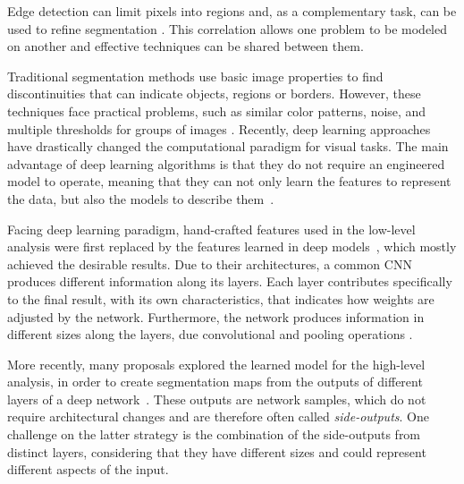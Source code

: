 Edge detection can limit pixels into regions and, as a complementary task, can be used to refine segmentation \cite{MARTIN:1273918}.
This correlation allows one problem to be modeled on another and effective techniques can be shared between them.

Traditional segmentation methods use basic image properties to find discontinuities that can indicate objects, regions or borders.
However, these techniques face practical problems, such as similar color patterns, noise, and multiple thresholds for groups of images \cite{MARTIN:1273918} \cite{Segnet:2017:7803544}.
Recently, deep learning approaches have drastically changed the computational paradigm for visual tasks. The main advantage of deep learning algorithms is that they do not require an engineered model to operate, meaning that they can not only learn the features to represent the data, but also the models to describe them~\cite{Goodfellow:2016}.

Facing deep learning paradigm, hand-crafted features used in the low-level analysis were first replaced by the features learned in deep models~\cite{Farabet:2013, VGGNET:2014, Lee:2015}, which mostly achieved the desirable results.
Due to their architectures, a common CNN produces different information along its layers.
Each layer contributes specifically to the final result, with its own characteristics, that indicates how weights are adjusted by the network.
Furthermore, the network produces information in different sizes along the layers, due convolutional and pooling operations \cite{VGGNET:2014, Zeiler:2014, Fidler:2007, Hadji:2018}. %

More recently, many proposals explored the learned model for the high-level analysis, in order to create segmentation maps from the outputs of different layers of a deep network~\cite{Xie:2017:HED:3158436.3158453, Cheng:2016, COB:2016, RCF:2017:8100105, Yang:2018}.
These outputs are network samples, which do not require architectural changes and are therefore often called \textit{side-outputs}.
One challenge on the latter strategy is the combination of the side-outputs from distinct layers, considering that they have different sizes and could represent different aspects of the input.

